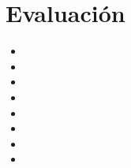 \documentclass[letterpaper,12pt]{article}
\begin{document}


\section{Evaluación}
\begin{itemize}
\item %
\item %
\item %
\item %
\item %
\item %
\item %
\item %
\end{itemize}
\end{document}
